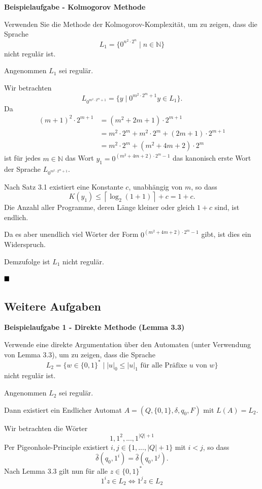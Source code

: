 \documentclass[a4paper, 11pt]{article}
\def\N{\mathbb{N}}
\newcommand\myTitle[1]{{\large \textbf {#1}}}
\begin{document}
    \myTitle{Beispielaufgabe - Kolmogorov Methode}

    Verwenden Sie die Methode der Kolmogorov-Komplexität, um zu zeigen, dass die Sprache 
    $$L_1 = \{0^{n^2 \cdot 2^n} \mid n \in \N\}$$
    nicht regulär ist.

    Angenommen $L_1$ sei regulär. 
    
    Wir betrachten 
    $$L_{0^{m^2 \cdot 2^m + 1}} = \{y \mid 0^{m^2 \cdot 2^m + 1}y \in L_1\}.$$
    Da
    \begin{align*}
        (m+1)^2 \cdot 2^{m+1} &= (m^2 + 2m + 1)\cdot 2^{m+1}\\
        &= m^2 \cdot 2^m + m^2 \cdot 2^m + (2m + 1) \cdot 2^{m+1}\\
        &= m^2 \cdot 2^m + (m^2 + 4m + 2) \cdot 2^m
    \end{align*}
    ist für jedes $m \in \N$ das Wort $y_1 = 0^{(m^2 + 4m + 2) \cdot 2^m - 1}$ das kanonisch erste Wort der Sprache $L_{0^{m^2\cdot 2^m +1}}$.

    Nach Satz 3.1 existiert eine Konstante $c$, unabhängig von $m$, so dass 
    $$K(y_1) \leq \left\lceil\log_2(1+1)\right\rceil + c = 1+ c.$$
    Die Anzahl aller Programme, deren Länge kleiner oder gleich $1 + c$ sind, ist endlich. 
    
    Da es aber unendlich viel Wörter der Form $0^{(m^2 + 4m + 2) \cdot 2^m - 1}$ gibt, ist dies ein Widerspruch.

    Demzufolge ist $L_1$ nicht regulär.

    $\hfill\blacksquare$

\subsection{Weitere Aufgaben}

    \myTitle{Beispielaufgabe 1 - Direkte Methode (Lemma 3.3)}

    Verwende eine direkte Argumentation über den Automaten (unter Verwendung von Lemma 3.3), um zu zeigen, dass die Sprache
    $$L_2 = \{w \in \{0,1\}^* \mid |u|_0 \leq |u|_1 \text{ für alle Präfixe }u \text{ von }w\}$$
    nicht regulär ist.

    Angenommen $L_2$ sei regulär. 
    
    Dann existiert ein Endlicher Automat $A = (Q, \{0,1\}, \delta, q_0, F)$ mit $L(A) = L_2$. 
    
    Wir betrachten die Wörter
    $$1, 1^2, ..., 1^{|Q|+1}$$
    Per Pigeonhole-Principle existiert $i, j \in \{1, ..., |Q|+1\}$ mit $i < j$, so dass 
    $$\hat{\delta}(q_0, 1^i) = \hat{\delta}(q_0, 1^j).$$
    Nach Lemma 3.3 gilt nun für alle $z \in \{0,1\}^*$
    $$1^iz \in L_2 \iff 1^jz \in L_2$$
\end{document}
